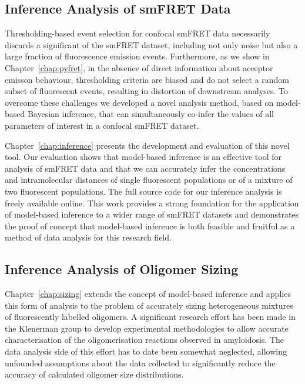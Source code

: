 \subsection{Inference Analysis of smFRET Data}
Thresholding-based event selection for confocal smFRET data necessarily discards a significant of the smFRET dataset, including not only noise but also a large fraction of fluorescence emission events. Furthermore, as we show in Chapter~\ref{chap:pyfret}, in the absence of direct information about acceptor emisson behaviour, thresholding criteria are biased and do not select a random subset of fluorescent events, resulting in distortion of downstream analyses. To overcome these challenges we developed a novel analysis method, based on model-based Bayesian inference, that can simultaneously co-infer the values of all parameters of interest in a confocal smFRET dataset.

Chapter~\ref{chap:inference} presents the development and evaluation of this novel tool. Our evaluation shows that model-based inference is an effective tool for analysis of smFRET data and that we can accurately infer the concentrations and intramolecular distances of single fluorescent populations or of a mixture of two fluorescent populations. The full source code for our inference analysis is freely available online. This work provides a strong foundation for the application of model-based inference to a wider range of smFRET datasets and demonstrates the proof of concept that model-based inference is both feasible and fruitful as a method of data analysis for this research field.  

\subsection{Inference Analysis of Oligomer Sizing}
Chapter~\ref{chap:sizing} extends the concept of model-based inference and applies this form of analysis to the problem of accurately sizing heterogeneous mixtures of fluorescently labelled oligomers. A significant research effort has been made in the Klenerman group to develop experimental methodologies to allow accurate characterisation of the oligomerisation reactions observed in amyloidosis. The data analysis side of this effort has to date been somewhat neglected, allowing unfounded assumptions about the data collected to significantly reduce the accuracy of calculated oligomer size distributions.

